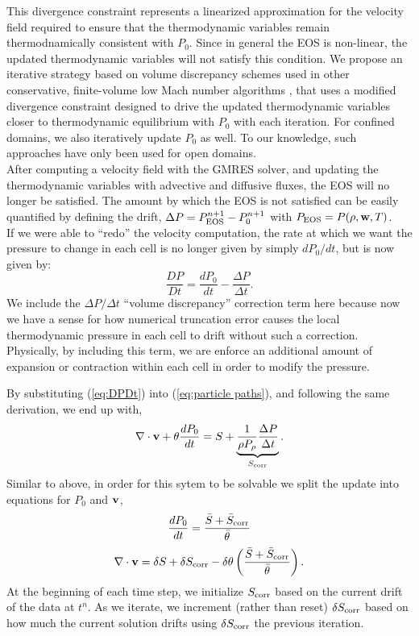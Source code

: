 \documentclass[final]{siamltex}
\def\vb {{\bf v}}
\def\wb {{\bf w}}
\begin{document}
This divergence constraint represents a linearized approximation for the velocity 
field required to ensure that the thermodynamic variables remain thermodnamically
consistent with $P_0$.  Since in general the EOS is non-linear, the updated 
thermodynamic variables will not
satisfy this condition.  We propose an iterative strategy based on
volume discrepancy schemes used
in other conservative, finite-volume low Mach number algorithms
\cite{Pember:1998,XRB}, that
uses a modified divergence constraint designed to drive the updated 
thermodynamic variables closer to thermodynamic equilibrium with $P_0$ with each iteration.
For confined domains, we also iteratively update $P_0$ as well.  To our knowledge,
such approaches have only been used for open domains.\\

After computing a velocity field with the GMRES solver, and updating the thermodynamic
variables with advective and diffusive fluxes, the EOS will no longer be satisfied.
The amount by which the EOS is not satisfied can be easily quantified by defining
the drift, $\Delta P = P_{\rm EOS}^{n+1} - P_0^{n+1}$ with $P_{\rm EOS} = P(\rho,\wb,T)$.\\

If we were able to ``redo'' the velocity computation, the rate at which we want the 
pressure to change in each cell is no longer given
by simply $dP_0/dt$, but is now given by:
\begin{equation}
\frac{DP}{Dt} = \frac{dP_0}{dt} - \frac{\Delta P}{\Delta t}.\label{eq:DPDt}
\end{equation}
We include the $\Delta P/\Delta t$ ``volume discrepancy'' correction term here because 
now we have a sense for how numerical truncation error causes the local thermodynamic pressure in 
each cell to drift without such a correction.  Physically, by including this term, we are enforce 
an additional amount of expansion or contraction within each cell in order to modify 
the pressure.  

By substituting (\ref{eq:DPDt}) into (\ref{eq:particle paths}),
and following the same derivation, we end up with,
\begin{equation}
\nabla\cdot\vb + \theta\frac{dP_0}{dt} = S + \underbrace{\frac{1}{\rho P_\rho}\frac{\Delta P}{\Delta t}}_{S_{\rm corr}}.
\end{equation}
Similar to above, in order for this sytem to be solvable we split the update into
equations for $P_0$ and $\vb$,
\begin{equation}
\frac{dP_0}{dt} = \frac{\bar{S} + \bar{S}_{\rm corr}}{\bar{\theta}}
\end{equation}
\begin{equation}
\nabla\cdot\vb = \delta S + \delta S_{\rm corr} - \delta\theta\left(\frac{\bar{S} + \bar{S}_{\rm corr}}{\bar{\theta}}\right).
\end{equation}
At the beginning of each time step, we initialize $S_{\rm corr}$ based on the current drift of the data at $t^n$.
As we iterate, we increment (rather than reset) $\delta S_{\rm corr}$ based on how much 
the current solution drifts using $\delta S_{\rm corr}$ the previous iteration.
\end{document}
